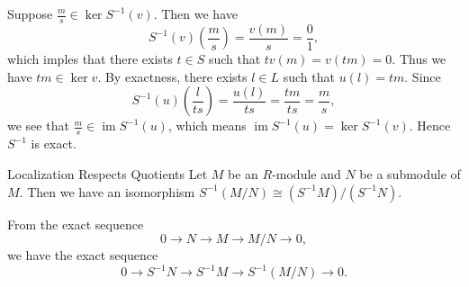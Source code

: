 \begin{prf}
    Suppose $\frac{m}{s}\in \ker S^{-1}(v) $. Then we have
    \[
        S^{-1}(v)\left(\frac{m}{s}\right)=\frac{v(m)}{s}=\frac{0}{1},
    \]
    which imples that there exists $t\in S$ such that $tv(m)=v(tm)=0$. Thus we have $tm\in \ker v$. By exactness, there exists $l\in L$ such that $u(l)=tm$. Since 
    \[
        S^{-1}(u)\left(\frac{l}{ts}\right)=\frac{u(l)}{ts}=\frac{tm}{ts}=\frac{m}{s},
    \]
    we see that $\frac{m}{s}\in \operatorname{im}S^{-1}(u)$, which means $\operatorname{im}S^{-1}(u)=\ker S^{-1}(v)$. Hence $S^{-1}$ is exact.
\end{prf}

\begin{proposition}{Localization Respects Quotients}{}
    Let $M$ be an $R$-module and $N$ be a submodule of $M$. Then we have an isomorphism $S^{-1}(M/N)\cong (S^{-1}M)/(S^{-1}N)$.
\end{proposition}

\begin{prf}
    From the exact sequence
    \[
        0\longrightarrow N\longrightarrow M\longrightarrow M/N\longrightarrow 0,
    \]
    we have the exact sequence
    \[
        0\longrightarrow S^{-1}N\longrightarrow S^{-1}M\longrightarrow S^{-1}(M/N)\longrightarrow 0.
    \]
\end{prf}

